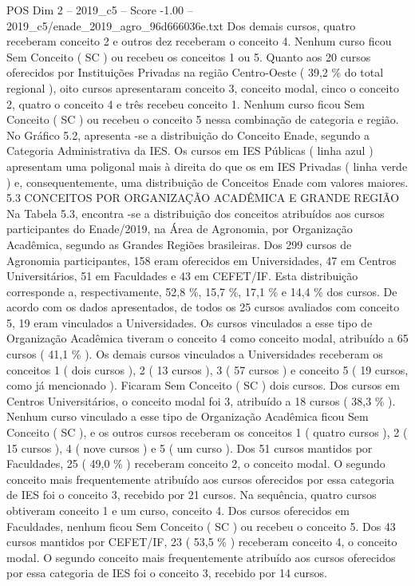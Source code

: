\begin{textsample}{POS Dim 2 – 2019\_c5 – Score -1.00 – 2019\_c5/enade\_2019\_agro\_96d666036e.txt}
Dos demais cursos, quatro receberam conceito 2 e outros dez receberam o conceito 4.
Nenhum curso ficou Sem Conceito ( SC ) ou recebeu os conceitos 1 ou 5.
Quanto aos 20 cursos oferecidos por Instituições Privadas na região Centro-Oeste ( 39,2 \% do total regional ), oito cursos apresentaram conceito 3, conceito modal, cinco o conceito 2, quatro o conceito 4 e três recebeu conceito 1.
Nenhum curso ficou Sem Conceito ( SC ) ou recebeu o conceito 5 nessa combinação de categoria e região.
No Gráfico 5.2, apresenta -se a distribuição do Conceito Enade, segundo a Categoria Administrativa da IES.
Os cursos em IES Públicas ( linha azul ) apresentam uma poligonal mais à direita do que os em IES Privadas ( linha verde ) e, consequentemente, uma distribuição de Conceitos Enade com valores maiores. 5.3 CONCEITOS POR ORGANIZAÇÃO ACADÊMICA E GRANDE REGIÃO Na Tabela 5.3, encontra -se a distribuição dos conceitos atribuídos aos cursos participantes do Enade/2019, na Área de Agronomia, por Organização Acadêmica, segundo as Grandes Regiões brasileiras.
Dos 299 cursos de Agronomia participantes, 158 eram oferecidos em Universidades, 47 em Centros Universitários, 51 em Faculdades e 43 em CEFET/IF.
Esta distribuição corresponde a, respectivamente, 52,8 \%, 15,7 \%, 17,1 \% e 14,4 \% dos cursos.
De acordo com os dados apresentados, de todos os 25 cursos avaliados com conceito 5, 19 eram vinculados a Universidades.
Os cursos vinculados a esse tipo de Organização Acadêmica tiveram o conceito 4 como conceito modal, atribuído a 65 cursos ( 41,1 \% ).
Os demais cursos vinculados a Universidades receberam os conceitos 1 ( dois cursos ), 2 ( 13 cursos ), 3 ( 57 cursos ) e conceito 5 ( 19 cursos, como já mencionado ).
Ficaram Sem Conceito ( SC ) dois cursos.
Dos cursos em Centros Universitários, o conceito modal foi 3, atribuído a 18 cursos ( 38,3 \% ).
Nenhum curso vinculado a esse tipo de Organização Acadêmica ficou Sem Conceito ( SC ), e os outros cursos receberam os conceitos 1 ( quatro cursos ), 2 ( 15 cursos ), 4 ( nove cursos ) e 5 ( um curso ).
Dos 51 cursos mantidos por Faculdades, 25 ( 49,0 \% ) receberam conceito 2, o conceito modal.
O segundo conceito mais frequentemente atribuído aos cursos oferecidos por essa categoria de IES foi o conceito 3, recebido por 21 cursos.
Na sequência, quatro cursos obtiveram conceito 1 e um curso, conceito 4.
Dos cursos oferecidos em Faculdades, nenhum ficou Sem Conceito ( SC ) ou recebeu o conceito 5.
Dos 43 cursos mantidos por CEFET/IF, 23 ( 53,5 \% ) receberam conceito 4, o conceito modal.
O segundo conceito mais frequentemente atribuído aos cursos oferecidos por essa categoria de IES foi o conceito 3, recebido por 14 cursos.

\end{textsample}
